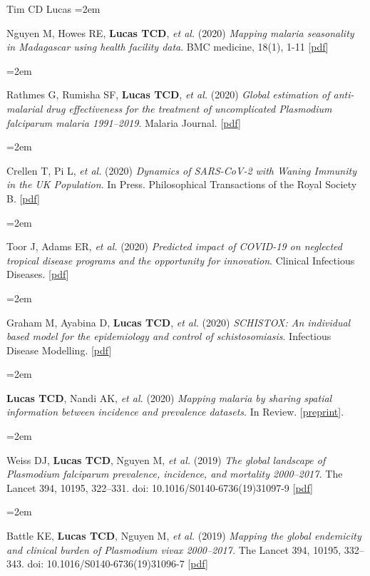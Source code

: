 \documentclass{scrartcl}
\newcommand{\MarginText}[1]{\marginpar{\raggedleft\itshape\small#1}} %
\newcommand{\Description}[1]{\hangindent=2em\hangafter=0\noindent\raggedright\footnotesize{#1}\par\normalsize\vspace{1em}} %
\begin{document}
\begin{cv}{Tim {\Large CD} Lucas}
\Description{Nguyen M, Howes RE, \textbf{Lucas TCD},  \emph{et al.} (2020) \emph{Mapping malaria seasonality in Madagascar using health facility data}. BMC medicine, 18(1), 1-11 [\href{https://bmcmedicine.biomedcentral.com/track/pdf/10.1186/s12916-019-1486-3}{pdf}]}


\Description{Rathmes G, Rumisha SF, \textbf{Lucas TCD}, \emph{et al.} (2020) \emph{Global estimation of anti-malarial drug effectiveness for the treatment of uncomplicated \emph{Plasmodium falciparum} malaria 1991--2019}. Malaria Journal. [\href{https://link.springer.com/article/10.1186/s12936-020-03446-8}{pdf}]}

\Description{Crellen T, Pi L, \emph{et al.} (2020) \emph{Dynamics of SARS-CoV-2 with Waning Immunity in the UK Population}. In Press. Philosophical Transactions of the Royal Society B. [\href{https://www.medrxiv.org/content/10.1101/2020.07.24.20157982v1}{pdf}]}


\Description{Toor J, Adams ER, \emph{et al.} (2020) \emph{Predicted impact of COVID-19 on neglected tropical disease programs and the opportunity for innovation}. Clinical Infectious Diseases. [\href{https://www.ncbi.nlm.nih.gov/pmc/articles/PMC7543306/}{pdf}]}

\Description{Graham M, Ayabina D, \textbf{Lucas TCD}, \emph{et al.} (2020) \emph{SCHISTOX: An individual based model for the epidemiology and control of schistosomiasis}. Infectious Disease Modelling. [\href{https://www.sciencedirect.com/science/article/pii/S2468042721000130}{pdf}]}


\Description{\textbf{Lucas TCD}, Nandi AK,  \emph{et al.} (2020) \emph{Mapping malaria by sharing spatial information between incidence and prevalence datasets}. In Review. [\href{https://www.medrxiv.org/content/10.1101/2020.02.14.20023069v1}{preprint}].}


\Description{\MarginText{2019}Weiss DJ, \textbf{Lucas TCD}, Nguyen M, \emph{et al.} (2019) \emph{The global landscape of \emph{Plasmodium falciparum} prevalence, incidence, and mortality 2000--2017.} The Lancet 394, 10195, 322--331. doi: 10.1016/S0140-6736(19)31097-9 [\href{https://doi.org/10.1016/S0140-6736(19)31097-9}{pdf}]}

\Description{Battle KE, \textbf{Lucas TCD},  Nguyen M, \emph{et al.} (2019) \emph{Mapping the global endemicity and clinical burden of \emph{Plasmodium vivax} 2000--2017.} The Lancet 394, 10195, 332--343. doi: 10.1016/S0140-6736(19)31096-7 [\href{https://doi.org/10.1016/S0140-6736(19)31096-7}{pdf}]}




\end{cv}
\end{document}
